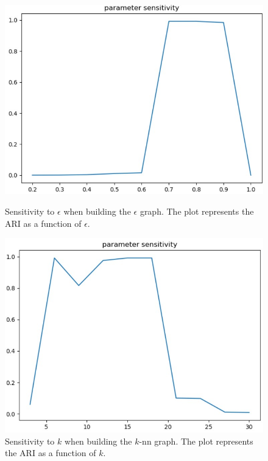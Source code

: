 \documentclass[a4paper, 11pt]{article}
\begin{document}
    \begin{figure}[!ht]
    \begin{minipage}{.45\textwidth}
        \centering
        \includegraphics[width=\textwidth]{images/ari_eps.jpg}
        \caption{Sensitivity to $\epsilon$ when building the $\epsilon$ graph. The plot represents the ARI as a function of $\epsilon$.}
        \label{fig:ari-eps}
    \end{minipage}
    \hfill
    \begin{minipage}{.45\textwidth}
        \centering
        \includegraphics[width=\textwidth]{images/ari_knn.jpg}
        \caption{Sensitivity to $k$ when building the $k$-nn graph. The plot represents the ARI as a function of $k$.}
        \label{fig:ari-knn}
    \end{minipage}
    \end{figure}
\end{document}
